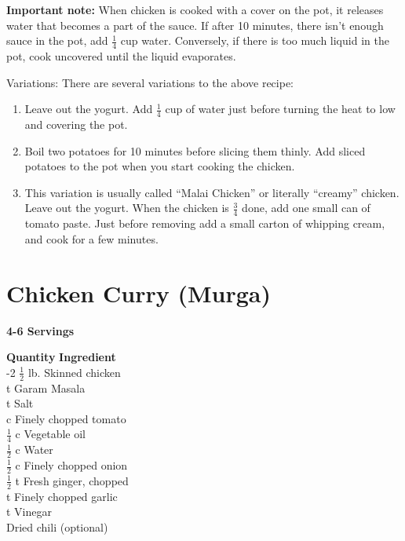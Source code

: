 {\bf Important note:}  When chicken is cooked with a cover on the pot,  it
      releases  water  that  becomes  a  part  of  the sauce.  If after 10
      minutes, there isn't enough sauce in the pot,  add  $\frac{1}{4}$  cup  water.
      Conversely,  if  there  is too much liquid in the pot, cook uncovered
      until the liquid evaporates.

Variations:  There are several variations to the above recipe:

\begin{enumerate}
\item Leave out the yogurt. Add $\frac{1}{4}$ cup of water just before  turning  the
      heat to low and covering the pot.
   \item Boil  two  potatoes  for 10 minutes before slicing them thinly.  Add sliced
      potatoes to the pot when you start cooking the chicken.
   \item This variation  is  usually  called  ``Malai  Chicken''  or  literally
      ``creamy''  chicken.  Leave  out  the yogurt.  When the chicken is $\frac{3}{4}$
      done, add one small can of tomato paste.   Just  before  removing  add a
      small carton of whipping cream, and cook for a few minutes.
\end{enumerate}

\section{Chicken Curry (Murga)}         
{\bf 4-6 Servings}

\begin{tabbing}
\hspace{1.0cm}  \={\bf Quantity}   \hspace{3.0cm} \={\bf Ingredient}\\

-2 $\frac{1}{2}$ lb. \>Skinned chicken\\
 t \>Garam Masala\\
 t \>Salt\\
 c \>Finely chopped tomato\\
\>$\frac{1}{4}$ c \>Vegetable oil\\
\>$\frac{1}{2}$ c \>Water\\
 $\frac{1}{2}$ c \>Finely chopped onion\\
 $\frac{1}{2}$ t \>Fresh ginger, chopped\\
 t \>Finely chopped garlic\\
 t \>Vinegar\\
 \>Dried chili (optional)\\
\end{tabbing}

